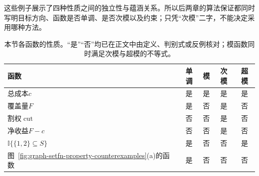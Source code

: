 这些例子展示了四种性质之间的独立性与蕴涵关系。所以后两章的算法保证都同时写明目标方向、函数是否单调、是否次模以及约束；只凭“次模”二字，不能决定采用哪种方法。

\begin{table}[!htb]
  \centering
  \small
  \begin{tabular}{@{}lcccc@{}}
    \toprule
    函数 & 单调 & 模 & 次模 & 超模 \\
    \midrule
    总成本$c$ & 是 & 是 & 是 & 是 \\
    覆盖量$F$ & 是 & 否 & 是 & 否 \\
    割权$\operatorname{cut}$ & 否 & 否 & 是 & 否 \\
    净收益$F-c$ & 否 & 否 & 是 & 否 \\
    $\mathbb I\{\{1,2\}\subseteq S\}$ & 是 & 否 & 否 & 是 \\
    图~\ref{fig:graph-setfn-property-counterexamples}(a)的函数 & 是 & 否 & 否 & 否 \\
    \bottomrule
  \end{tabular}
  \caption{本节各函数的性质。“是”“否”均已在正文中由定义、判别式或反例核对；模函数同时满足次模与超模的不等式。}
  \label{tab:graph-setfn-property-summary}
\end{table}

